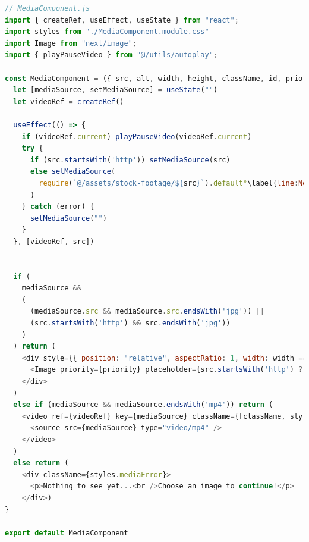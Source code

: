 \documentclass[a4paper, 12pt]{article}
\begin{document}


\begin{lstlisting}[caption=MediaComponent in Next.js, label={lst:Next:MediaComponent}, language=JavaScript, escapechar=°]
// MediaComponent.js
import { createRef, useEffect, useState } from "react";
import styles from "./MediaComponent.module.css"
import Image from "next/image";
import { playPauseVideo } from "@/utils/autoplay";

const MediaComponent = ({ src, alt, width, height, className, id, priority = false }) => {
  let [mediaSource, setMediaSource] = useState("")
  let videoRef = createRef()

  useEffect(() => {
    if (videoRef.current) playPauseVideo(videoRef.current)
    try {
      if (src.startsWith('http')) setMediaSource(src)
      else setMediaSource(
        require(`@/assets/stock-footage/${src}`).default°\label{line:Next:MediaComponent:imageImport}°
      )
    } catch (error) {
      setMediaSource("")
    }
  }, [videoRef, src])


  if (
    mediaSource &&
    (
      (mediaSource.src && mediaSource.src.endsWith('jpg')) ||
      (src.startsWith('http') && src.endsWith('jpg'))
    )
  ) return (
    <div style={{ position: "relative", aspectRatio: 1, width: width == "100%" ? width : `${width}px`, overflow: "hidden" }} id={id} className={[className, styles.postMedia].join(" ")}>
      <Image priority={priority} placeholder={src.startsWith('http') ? "empty" : "blur"} quality={50} src={mediaSource} alt={alt} width={width.endsWith("%") ? 600 : width} height={height || (width.endsWith("%") ? 600 : width)} />
    </div>
  )
  else if (mediaSource && mediaSource.endsWith('mp4')) return (
    <video ref={videoRef} key={mediaSource} className={[className, styles.postMedia].join(" ")} id={id} width={width} preload="metadata" controls controlsList="nodownload,nofullscreen,noremoteplayback" disablePictureInPicture loop muted >
      <source src={mediaSource} type="video/mp4" />
    </video>
  )
  else return (
    <div className={styles.mediaError}>
      <p>Nothing to see yet...<br />Choose an image to continue!</p>
    </div>)
}

export default MediaComponent
\end{lstlisting}

\end{document}

